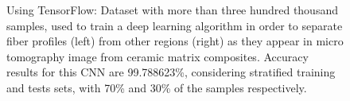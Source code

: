 

\begin{figure}[!t]
\centering
{}
\hfil
{}
\caption{Using TensorFlow: Dataset with more than three hundred thousand samples, used to train a deep
learning algorithm in order to separate fiber profiles (left) from other regions (right) as they
appear in micro tomography image from ceramic matrix composites. Accuracy results for this CNN are
99.788623\%, considering stratified training and tests sets, with 70\% and 30\% of the samples
respectively.}
\label{fig:pycbir}
\end{figure}




